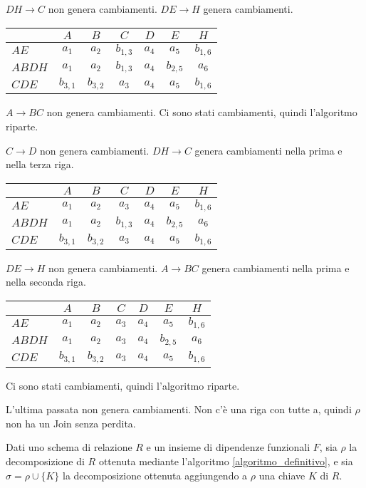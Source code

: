\begin{exmp}
$DH \to C$ non genera cambiamenti. $DE \to H$ genera cambiamenti.

\begin{tabular}{l|*{6}{c}}
& $A$ & $B$ & $C$ & $D$ & $E$ & $H$ \\
\hline
$AE$ & $a_1$ & $a_2$ & $b_{1,3}$ & $a_4$ & $a_5$ & $b_{1,6}$ \\
$ABDH$ & $a_1$ & $a_2$ & $b_{1,3}$ & $a_4$ & $b_{2,5}$ & $a_6$ \\
$CDE$ & $b_{3,1}$ & $b_{3,2}$ & $a_3$ & $a_4$ & $a_5$ & \cellcolor{green!20} $b_{1,6}$
\end{tabular}

$A \to BC$ non genera cambiamenti. Ci sono stati cambiamenti, quindi l'algoritmo riparte.

$C \to D$ non genera cambiamenti. $DH \to C$ genera cambiamenti nella prima e nella terza riga.

\begin{tabular}{l|*{6}{c}}
& $A$ & $B$ & $C$ & $D$ & $E$ & $H$ \\
\hline
$AE$ & $a_1$ & $a_2$ & \cellcolor{green!20} $a_3$ & $a_4$ & $a_5$ & $b_{1,6}$ \\
$ABDH$ & $a_1$ & $a_2$ & $b_{1,3}$ & $a_4$ & $b_{2,5}$ & $a_6$ \\
$CDE$ & $b_{3,1}$ & $b_{3,2}$ & $a_3$ & $a_4$ & $a_5$ & $b_{1,6}$
\end{tabular}

$DE \to H$ non genera cambiamenti. $A \to BC$ genera cambiamenti nella prima e nella seconda riga.

\begin{tabular}{l|*{6}{c}}
& $A$ & $B$ & $C$ & $D$ & $E$ & $H$ \\
\hline
$AE$ & $a_1$ & $a_2$ & $a_3$ & $a_4$ & $a_5$ & $b_{1,6}$ \\
$ABDH$ & $a_1$ & $a_2$ & \cellcolor{green!20} $a_3$ & $a_4$ & $b_{2,5}$ & $a_6$ \\
$CDE$ & $b_{3,1}$ & $b_{3,2}$ & $a_3$ & $a_4$ & $a_5$ & $b_{1,6}$
\end{tabular}

Ci sono stati cambiamenti, quindi l'algoritmo riparte.

L'ultima passata non genera cambiamenti. Non c'\`e una riga con tutte a, quindi $\rho$ non ha un Join senza perdita.
\end{exmp}

Dati uno schema di relazione $R$ e un insieme di dipendenze funzionali $F$, sia $\rho$ la decomposizione di $R$ ottenuta mediante l'algoritmo \ref{algoritmo_definitivo}, e sia $\sigma = \rho \cup \{ K \}$ la decomposizione ottenuta aggiungendo a $\rho$ una chiave $K$ di $R$.

